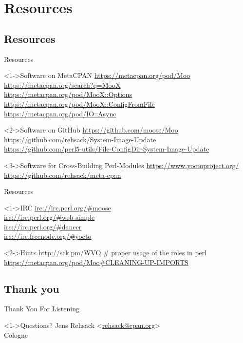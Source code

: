 \documentclass[ngerman,xcolor={table,dvipsnames},smaller,compress,hyperref={bookmarks,colorlinks}]{beamer}%
\begin{document}
\section{Resources}

\subsection{Resources}

\begin{frame}[t,fragile]{Resources}
\begin{block}<1->{Software on MetaCPAN}
\url{https://metacpan.org/pod/Moo} \\
\url{https://metacpan.org/search?q=MooX} \\
\url{https://metacpan.org/pod/MooX::Options} \\
\url{https://metacpan.org/pod/MooX::ConfigFromFile} \\
\url{https://metacpan.org/pod/IO::Async}
\end{block}

\begin{block}<2->{Software on GitHub}
\url{https://github.com/moose/Moo} \\
\url{https://github.com/rehsack/System-Image-Update} \\
\url{https://github.com/perl5-utils/File-ConfigDir-System-Image-Update}
\end{block}

\begin{block}<3->{Software for Cross-Building Perl-Modules}
\url{https://www.yoctoproject.org/} \\
\url{https://github.com/rehsack/meta-cpan}
\end{block}
\end{frame}

\begin{frame}[t,fragile]{Resources}
\begin{block}<1->{IRC}
\url{irc://irc.perl.org/#moose} \\
\url{irc://irc.perl.org/#web-simple} \\
\url{irc://irc.perl.org/#dancer} \\
\url{irc://irc.freenode.org/#yocto}
\end{block}

\begin{block}<2->{Hints}
\url{http://sck.pm/WVO} \# proper usage of the roles in perl \\
\url{https://metacpan.org/pod/Moo\#CLEANING-UP-IMPORTS}
\end{block}
\end{frame}

\subsection{Thank you}

\begin{frame}[fragile]{Thank You For Listening}
\begin{block}<1->{Questions?}
Jens Rehsack \textless{}\href{mailto:rehsack@cpan.org}{rehsack@cpan.org}\textgreater{} \\
Cologne
\end{block}
\end{frame}
\end{document}
